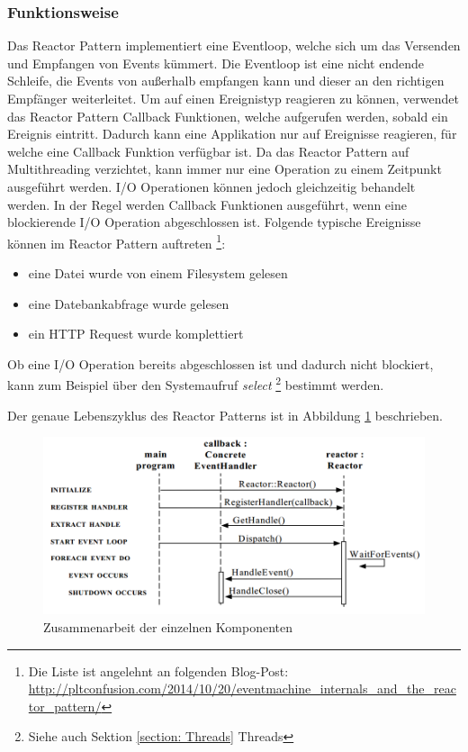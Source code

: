 \subsubsection{Funktionsweise}

Das Reactor Pattern implementiert eine Eventloop, welche sich um das Versenden und Empfangen von Events kümmert. Die Eventloop ist eine nicht endende Schleife, die Events von außerhalb empfangen kann und dieser an den richtigen Empfänger weiterleitet. Um auf einen Ereignistyp reagieren zu können, verwendet das Reactor Pattern Callback Funktionen, welche aufgerufen werden, sobald ein Ereignis eintritt. Dadurch kann eine Applikation nur auf Ereignisse reagieren, für welche eine Callback Funktion verfügbar ist. Da das Reactor Pattern auf Multithreading verzichtet, kann immer nur eine Operation zu einem Zeitpunkt ausgeführt werden. I/O Operationen können jedoch gleichzeitig behandelt werden. In der Regel werden Callback Funktionen ausgeführt, wenn eine blockierende I/O Operation abgeschlossen ist. Folgende typische Ereignisse können im Reactor Pattern auftreten \footnote{Die Liste ist angelehnt an folgenden Blog-Post: \url{http://pltconfusion.com/2014/10/20/eventmachine_internals_and_the_reactor_pattern/}}:

\begin{itemize}
  \item eine Datei wurde von einem Filesystem gelesen
  \item eine Datebankabfrage wurde gelesen
  \item ein HTTP Request wurde komplettiert
\end{itemize}

Ob eine I/O Operation bereits abgeschlossen ist und dadurch nicht blockiert, kann zum Beispiel über den Systemaufruf \emph{select} \footnote{Siehe auch Sektion \ref{section: Threads} Threads} bestimmt werden.

Der genaue Lebenszyklus des Reactor Patterns ist in Abbildung \ref{figure:reactor_cycle} beschrieben.

\begin{figure}[!htb]
  \centering
  \includegraphics[width=13cm]{images/reactor.png}
  \caption{
    Zusammenarbeit der einzelnen Komponenten \cite[p. 5]{Sch95}
  }
  \label{figure:reactor_cycle}
\end{figure}

